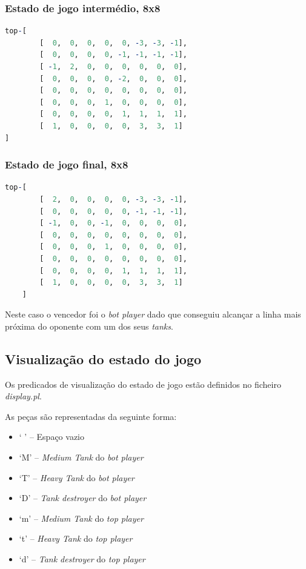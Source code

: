 \documentclass[a4paper,11pt,portuguese]{article}
\begin{document}
    \subsubsection{Estado de jogo intermédio, 8x8}
\begin{lstlisting}[language=prolog]
top-[
        [  0,  0,  0,  0,  0, -3, -3, -1],
        [  0,  0,  0,  0, -1, -1, -1, -1],
        [ -1,  2,  0,  0,  0,  0,  0,  0],
        [  0,  0,  0,  0, -2,  0,  0,  0],
        [  0,  0,  0,  0,  0,  0,  0,  0],
        [  0,  0,  0,  1,  0,  0,  0,  0],
        [  0,  0,  0,  0,  1,  1,  1,  1],
        [  1,  0,  0,  0,  0,  3,  3,  1]
]
\end{lstlisting}

    \subsubsection{Estado de jogo final, 8x8}
\begin{lstlisting}[language=prolog]
top-[
        [  2,  0,  0,  0,  0, -3, -3, -1],
        [  0,  0,  0,  0,  0, -1, -1, -1],
        [ -1,  0,  0, -1,  0,  0,  0,  0],
        [  0,  0,  0,  0,  0,  0,  0,  0],
        [  0,  0,  0,  1,  0,  0,  0,  0],
        [  0,  0,  0,  0,  0,  0,  0,  0],
        [  0,  0,  0,  0,  1,  1,  1,  1],
        [  1,  0,  0,  0,  0,  3,  3,  1]
    ]
\end{lstlisting}

    \noindent Neste caso o vencedor foi o \textit{bot player} dado que conseguiu
    alcançar a linha mais próxima do oponente com um dos seus \textit{tanks}.

    \subsection{Visualização do estado do jogo}

    Os predicados de visualização do estado de jogo estão definidos no ficheiro
    \textit{display.pl}.

    \noindent As peças são representadas da seguinte forma:
    \begin{itemize}[topsep=4pt,itemsep=2pt]
        \item ` ' -- Espaço vazio
        \item `M' -- \textit{Medium Tank} do \textit{bot player}
        \item `T' -- \textit{Heavy Tank} do \textit{bot player}
        \item `D' -- \textit{Tank destroyer} do \textit{bot player}
        \item `m' -- \textit{Medium Tank} do \textit{top player}
        \item `t' -- \textit{Heavy Tank} do \textit{top player}
        \item `d' -- \textit{Tank destroyer} do \textit{top player}
    \end{itemize}  
\end{document}
